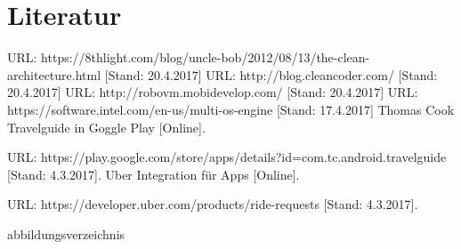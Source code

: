 \documentclass[a4paper,10pt,xetex]{article}
\begin{document}
















\appendix

\section{Literatur}
\begingroup
\renewcommand{\section}[2]{}%
\begin{thebibliography}{9}
   URL: https://8thlight.com/blog/uncle-bob/2012/08/13/the-clean-architecture.html [Stand: 20.4.2017]
   URL: http://blog.cleancoder.com/ [Stand: 20.4.2017]
   URL: http://robovm.mobidevelop.com/ [Stand: 20.4.2017]
   URL: https://software.intel.com/en-us/multi-os-engine [Stand: 17.4.2017]
    Thomas Cook Travelguide in Goggle Play [Online].

    URL: https://play.google.com/store/apps/details?id=com.tc.android.travelguide [Stand: 4.3.2017].
    Uber Integration für Apps [Online].

    URL: https://developer.uber.com/products/ride-requests [Stand: 4.3.2017].
\end{thebibliography}
\endgroup

\section{Abbildungsverzeichnis}\label{abbildungsverzeichnis}
\begingroup
\renewcommand{\section}[2]{}%
\hypersetup{linkcolor=black}
\listoffigures
\endgroup
\end{document}
